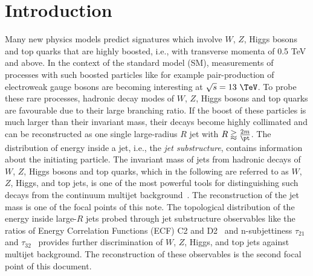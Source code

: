 \documentclass[UKenglish,texlive=2013]{\ATLASLATEXPATH atlasdoc}
\begin{document}
\maketitle

\tableofcontents

\newpage

\section{Introduction}
\label{sec:intro}



Many new physics models predict signatures which involve $W$, $Z$, Higgs bosons and top quarks that are highly boosted, i.e., with transverse momenta \pt of 0.5 TeV and above. In the context of the standard model (SM), measurements of processes with such boosted particles like for example pair-production of electroweak gauge bosons are becoming interesting at $\sqrt s =13~\TeV$. To probe these rare processes, hadronic decay modes of $W$, $Z$, Higgs bosons and top quarks are favourable due to their large branching ratio. If the boost of these particles is much larger than their invariant mass, their decays become highly collimated and can be reconstructed as one single large-radius $R$ jet with $R\gtrapprox\frac{2m}{\pt}$. The distribution of energy inside a jet, i.e., the {\em jet substructure}, contains information about the initiating particle. The invariant mass of jets from hadronic decays of $W$, $Z$, Higgs bosons and top quarks, which in the following are referred to as $W$, $Z$, Higgs, and top jets, is one of the most powerful tools for distinguishing such decays from the continuum multijet background~\cite{art35}. The reconstruction of the jet mass is one of the focal points of this note. The topological distribution of the energy inside large-$R$ jets probed through jet substructure observables like the ratios of Energy Correlation Functions (ECF) C2 and D2~\cite{bib:ECF} and n-subjettiness $\tau_{21}$ and $\tau_{32}$~\cite{bib:nsub} provides further discrimination of $W$, $Z$, Higgs, and top jets against  multijet background. The reconstruction of these observables is the second focal point of this document.
\end{document}
